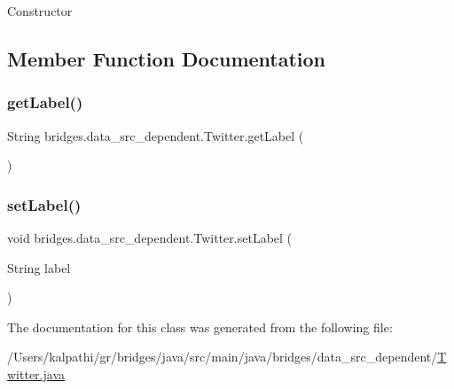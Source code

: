 Constructor 

\subsection{Member Function Documentation}
\mbox{\label{classbridges_1_1data__src__dependent_1_1_twitter_ac7d7ac0808192702bc4a1a790237da8b}} 
\subsubsection{\texorpdfstring{getLabel()}{getLabel()}}
{\footnotesize\ttfamily String bridges.\+data\+\_\+src\+\_\+dependent.\+Twitter.\+get\+Label (\begin{DoxyParamCaption}{ }\end{DoxyParamCaption})}

\mbox{\label{classbridges_1_1data__src__dependent_1_1_twitter_a4d7d3a015d66029f373d5c8e41659242}} 
\subsubsection{\texorpdfstring{setLabel()}{setLabel()}}
{\footnotesize\ttfamily void bridges.\+data\+\_\+src\+\_\+dependent.\+Twitter.\+set\+Label (\begin{DoxyParamCaption}\item[{String}]{label }\end{DoxyParamCaption})}



The documentation for this class was generated from the following file\+:\begin{DoxyCompactItemize}
\item 
/\+Users/kalpathi/gr/bridges/java/src/main/java/bridges/data\+\_\+src\+\_\+dependent/\mbox{\hyperlink{_twitter_8java}{Twitter.\+java}}\end{DoxyCompactItemize}

